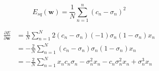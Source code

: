 \documentclass[fleqn]{article}
\renewcommand{\vec}[1]{\mathbf{#1}}
\begin{document}
\begin{equation}
    E_{sq} (\vec{w}) =
    \frac{1}{N} \sum_{n=1}^n
    \left( c_n - \sigma_n \right) ^ 2
\end{equation}

\begin{equation}
    \begin{split}
        \frac{\partial E}{\partial \vec{w}} & =
        \frac{1}{N} \sum_{n=1}^{N}
        2 (c_n - \sigma_n) (-1) \sigma_n (1 - \sigma_n) x_n \\
        & = - \frac{2}{N} \sum_{n=1}^{N}
        (c_n - \sigma_n) \sigma_n (1 - \sigma_n) x_n \\
        & = - \frac{2}{N} \sum_{n=1}^{N}
        x_n c_n \sigma_n - \sigma_n^2 x_n - c_n \sigma_n^2 x_n + \sigma_n^3 x_n
    \end{split}
\end{equation}
\end{document}
